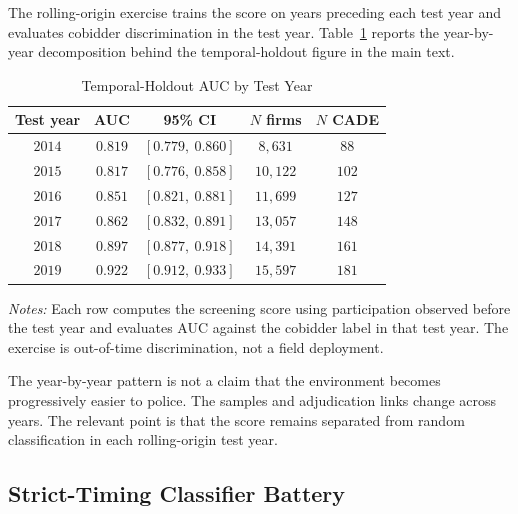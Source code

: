 The rolling-origin exercise trains the score on years preceding
each test year and evaluates cobidder discrimination in the test
year. Table~\ref{tab:temporal_holdout_year_submission} reports the
year-by-year decomposition behind the temporal-holdout figure in
the main text.

\begin{table}[htbp]
\centering
\caption{Temporal-Holdout AUC by Test Year}
\label{tab:temporal_holdout_year_submission}
\footnotesize
\begin{threeparttable}
\begin{tabular}{ccccc}
\toprule
Test year & AUC & 95\% CI & $N$ firms & $N$ CADE \\
\midrule
$2014$ & $0.819$ & $[0.779,\ 0.860]$ & $8{,}631$ & $88$ \\
$2015$ & $0.817$ & $[0.776,\ 0.858]$ & $10{,}122$ & $102$ \\
$2016$ & $0.851$ & $[0.821,\ 0.881]$ & $11{,}699$ & $127$ \\
$2017$ & $0.862$ & $[0.832,\ 0.891]$ & $13{,}057$ & $148$ \\
$2018$ & $0.897$ & $[0.877,\ 0.918]$ & $14{,}391$ & $161$ \\
$2019$ & $0.922$ & $[0.912,\ 0.933]$ & $15{,}597$ & $181$ \\
\bottomrule
\end{tabular}
\begin{tablenotes}
\footnotesize
\item \textit{Notes:} Each row computes the screening score using
participation observed before the test year and evaluates AUC
against the cobidder label in that test year. The exercise is
out-of-time discrimination, not a field deployment.
\end{tablenotes}
\end{threeparttable}
\end{table}

The year-by-year pattern is not a claim that the environment
becomes progressively easier to police. The samples and
adjudication links change across years. The relevant point is
that the score remains separated from random classification in
each rolling-origin test year.

\subsection{Strict-Timing Classifier Battery}
\label{app:timing_battery_submission}

